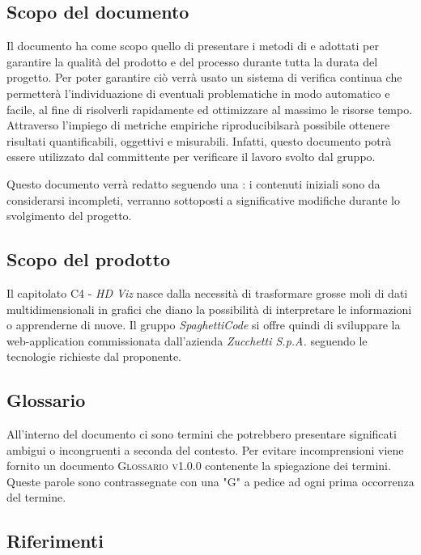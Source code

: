 \documentclass[../piano_di_qualifica.tex]{subfiles}
\begin{document}
\subsection{Scopo del documento}
Il documento ha come scopo quello di presentare i metodi di  e  adottati per garantire la qualità del prodotto e del processo durante tutta la durata del progetto. Per poter garantire ciò verrà usato un sistema di verifica continua che permetterà l'individuazione di eventuali problematiche in modo automatico e facile, al fine di risolverli rapidamente ed ottimizzare al massimo le risorse tempo.\\

Attraverso l’impiego di metriche empiriche riproducibilsarà possibile ottenere risultati quantificabili, oggettivi e misurabili. Infatti, questo documento potrà essere utilizzato dal committente per verificare il lavoro svolto dal gruppo.

Questo documento verrà redatto seguendo una : i contenuti iniziali sono da considerarsi incompleti, verranno sottoposti a significative modifiche  durante lo svolgimento del progetto.

\subsection{Scopo del prodotto}
Il capitolato C4 - \emph{HD Viz} nasce dalla necessità di trasformare grosse moli di dati multidimensionali in grafici che diano la possibilità di interpretare le informazioni o apprenderne di nuove. Il gruppo \emph{SpaghettiCode} si offre quindi di sviluppare la web-application commissionata dall’azienda \emph{Zucchetti S.p.A.} seguendo le tecnologie richieste dal proponente.

\subsection{Glossario}
All'interno del documento ci sono termini che potrebbero presentare significati ambigui o incongruenti a seconda del contesto. Per evitare incomprensioni viene fornito un documento \textsc{Glossario v1.0.0} contenente la spiegazione dei termini. Queste parole sono contrassegnate con una "G" a pedice ad ogni prima occorrenza del termine.

\subsection{Riferimenti}
\end{document}
